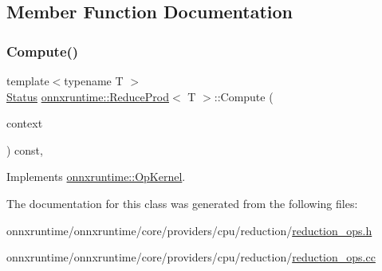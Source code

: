\subsection{Member Function Documentation}
\mbox{\label{classonnxruntime_1_1ReduceProd_a1f4a5053a81337797ba478085ffd780d}} 
\subsubsection{\texorpdfstring{Compute()}{Compute()}}
{\footnotesize\ttfamily template$<$typename T $>$ \\
\mbox{\hyperlink{classonnxruntime_1_1common_1_1Status}{Status}} \mbox{\hyperlink{classonnxruntime_1_1ReduceProd}{onnxruntime\+::\+Reduce\+Prod}}$<$ T $>$\+::Compute (\begin{DoxyParamCaption}\item[{\mbox{\hyperlink{classonnxruntime_1_1OpKernelContext}{Op\+Kernel\+Context}} $\ast$}]{context }\end{DoxyParamCaption}) const\hspace{0.3cm}{\ttfamily [override]}, {\ttfamily [virtual]}}



Implements \mbox{\hyperlink{classonnxruntime_1_1OpKernel_a9eca8656a78b1b3ab9d3351a12798650}{onnxruntime\+::\+Op\+Kernel}}.



The documentation for this class was generated from the following files\+:\begin{DoxyCompactItemize}
\item 
onnxruntime/onnxruntime/core/providers/cpu/reduction/\mbox{\hyperlink{cpu_2reduction_2reduction__ops_8h}{reduction\+\_\+ops.\+h}}\item 
onnxruntime/onnxruntime/core/providers/cpu/reduction/\mbox{\hyperlink{cpu_2reduction_2reduction__ops_8cc}{reduction\+\_\+ops.\+cc}}\end{DoxyCompactItemize}
